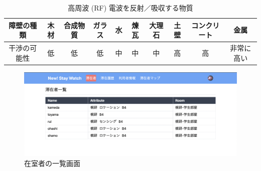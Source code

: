\begin{table}[H]
  \begin{center}
    \caption{高周波 (RF) 電波を反射／吸収する物質}
    \label{tb:rf}
    \begin{tabular}{|c||c|c|c|c|c|c|c|c|c|} \hline
      障壁の種類  & 木材 & 合成物質 & ガラス & 水 & 煉瓦 & 大理石 & 土壁 & コンクリート & 金属    \\ \hline
      干渉の可能性 & 低  & 低    & 低   & 中 & 中  & 中   & 高  & 高      & 非常に高い \\ \hline
    \end{tabular}
  \end{center}
\end{table}





\begin{figure}[H]
  \begin{center}
    \includegraphics[width=160mm]{image/stayer.png}
    \caption{在室者の一覧画面}
    \label{fig:stayer}
  \end{center}
\end{figure}



